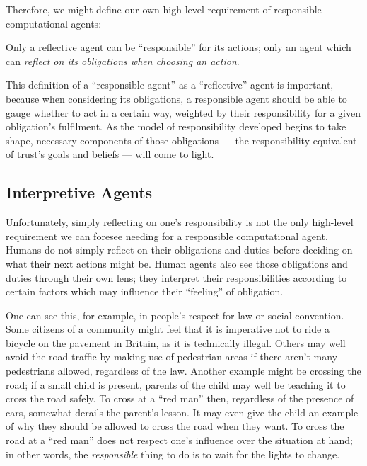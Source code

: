Therefore, we might define our own high-level requirement of responsible computational agents:

\begin{displayquote}
    Only a reflective agent can be ``responsible'' for its actions; only an agent which can \emph{reflect on its obligations when choosing an action}.
\end{displayquote}\par

This definition of a ``responsible agent'' as a ``reflective'' agent is important, because when considering its obligations, a responsible agent should be able to gauge whether to act in a certain way, weighted by their responsibility for a given obligation's fulfilment. As the model of responsibility developed begins to take shape, necessary components of those obligations --- the responsibility equivalent of trust's goals and beliefs --- will come to light.\par

\subsection{Interpretive Agents}\label{sec:agent_types}
Unfortunately, simply reflecting on one's responsibility is not the only high-level requirement we can foresee needing for a responsible computational agent. Humans do not simply reflect on their obligations and duties before deciding on what their next actions might be. Human agents also see those obligations and duties through their own lens; they interpret their responsibilities according to certain factors which may influence their ``feeling'' of obligation.\par

One can see this, for example, in people's respect for law or social convention. Some citizens of a community might feel that it is imperative not to ride a bicycle on the pavement in Britain, as it is technically illegal. Others may well avoid the road traffic by making use of pedestrian areas if there aren't many pedestrians allowed, regardless of the law. Another example might be crossing the road; if a small child is present, parents of the child may well be teaching it to cross the road safely. To cross at a ``red man'' then, regardless of the presence of cars, somewhat derails the parent's lesson. It may even give the child an example of why they should be allowed to cross the road when they want. To cross the road at a ``red man'' does not respect one's influence over the situation at hand; in other words, the \emph{responsible} thing to do is to wait for the lights to change.\par


